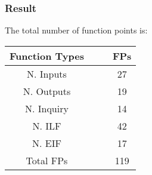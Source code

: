 		\subsubsection{Result}
			The total number of function points is:
			\vspace{0.5cm}
			\begin{center}
				\begin{tabular}{c c c c}
					\hline 	\textbf{Function Types} &	&	& \textbf{FPs} \\[0.1cm]
					\hline	N. Inputs & & & 27 \\[0.05cm]
						N. Outputs & & & 19  \\[0.05cm]
						N. Inquiry & & & 14  \\[0.05cm]
						N. ILF & & & 42  \\[0.05cm]
						N. EIF & & & 17  \\[0.05cm]
					\hline Total FPs & & & 119\\[0.05cm]
					\hline
				\end{tabular}
			\end{center}
			\vspace{0.5cm}
	\newpage

